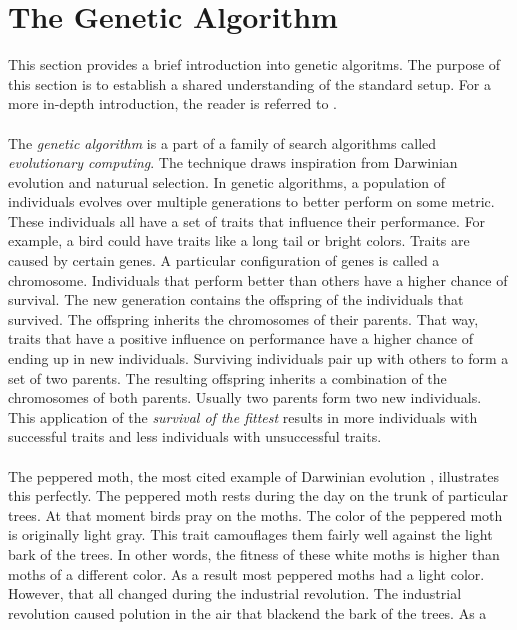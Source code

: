 
\section{The Genetic Algorithm}
This section provides a brief introduction into genetic algoritms. The purpose
of this section is to establish a shared understanding of the standard setup. For a more
in-depth introduction, the reader is referred to \citep{Eiben2007}.\\\\
\noindent
The \emph{genetic algorithm} \citep{Holland1992} is a part of a family of
search algorithms called \emph{evolutionary computing}. The technique draws
inspiration from Darwinian evolution and naturual selection. In genetic
algorithms, a population of individuals evolves over multiple generations to
better perform on some metric. These individuals all have a set of traits that
influence their performance. For example, a bird could have traits like a long
tail or bright colors. Traits are caused by certain genes. A particular
configuration of genes is called a chromosome. Individuals that perform better
than others have a higher chance of survival. The new generation contains the
offspring of the individuals that survived. The offspring inherits the
chromosomes of their parents. That way, traits that have a positive influence
on performance have a higher chance of ending up in new individuals. Surviving
individuals pair up with others to form a set of two parents. The resulting
offspring inherits a combination of the chromosomes of both parents. Usually
two parents form two new individuals. This application of the \emph{survival of
the fittest} results in more individuals with successful traits and less
individuals with unsuccessful traits.\\\\
\noindent
The peppered moth, the most cited example of Darwinian evolution
\citep{Majerus2009}, illustrates this perfectly. The peppered moth rests during
the day on the trunk of particular trees. At that moment birds pray on the
moths. The color of the peppered moth is originally light gray. This trait
camouflages them fairly well against the light bark of the trees. In other
words, the fitness of these white moths is higher than moths of a different
color. As a result most peppered moths had a light color.
However, that all changed during the industrial revolution. The industrial
revolution caused polution in the air that blackend the bark of the trees. As a
